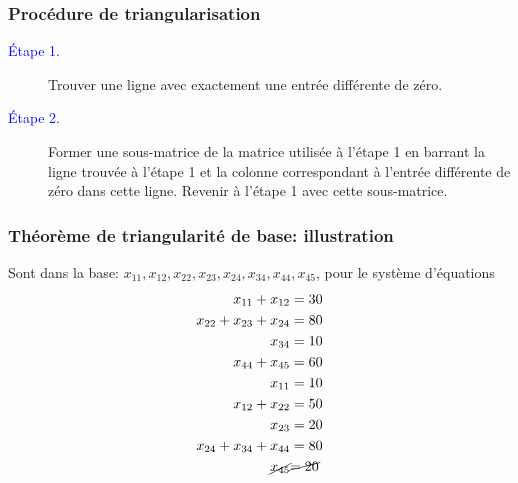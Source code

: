 \documentclass[usepdftitle=false, aspectratio=169]{beamer}
\begin{document}
\begin{frame}
\frametitle{Procédure de triangularisation}

\begin{description}
	\item[\textcolor{blue}{Étape 1.}]
Trouver une ligne avec exactement une entrée différente de zéro.
	\item[\textcolor{blue}{Étape 2.}]
Former une sous-matrice de la matrice utilisée à l'étape 1 en barrant la ligne
trouvée à l'étape 1 et la colonne correspondant à l'entrée différente de zéro dans cette ligne.
Revenir à l'étape 1 avec cette sous-matrice.
\end{description}

\end{frame}

\begin{frame}
\frametitle{Théorème de triangularité de base: illustration}

Sont dans la base: $x_{11}, x_{12}, x_{22}, x_{23}, x_{24}, x_{34}, x_{44}, x_{45}$, pour le système d'équations
\begin{align*}
x_{11} + x_{12} &= 30 \\
x_{22} + x_{23} + x_{24} &= 80 \\
x_{34} &= 10 \\
x_{44} + x_{45} &= 60 \\
x_{11} & = 10 \\
x_{12} + x_{22} &= 50 \\
x_{23} &= 20 \\
x_{24} + x_{34} + x_{44} &= 80 \\
\cancel{x_{45}} &\cancel{= 20}
\end{align*}

\end{frame}
\end{document}
